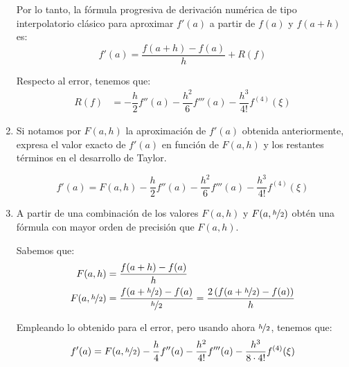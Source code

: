 \begin{ejercicio}
\begin{enumerate}
        Por lo tanto, la fórmula progresiva de derivación numérica de tipo interpolatorio clásico para aproximar $f'(a)$ a partir de $f(a)$ y $f(a + h)$ es:
        \begin{equation*}
            f'(a) = \dfrac{f(a + h) - f(a)}{h} + R(f)
        \end{equation*}

        Respecto al error, tenemos que:
        \begin{align*}
            R(f) &= -\dfrac{h}{2}f''(a) -\dfrac{h^2}{6}f'''(a) -\dfrac{h^3}{4!}f^{(4)}(\xi) 
        \end{align*}

        
        \item Si notamos por $F(a, h)$ la aproximación de $f'(a)$ obtenida anteriormente, expresa el valor exacto de $f'(a)$ en función de $F(a, h)$ y los restantes términos en el desarrollo de Taylor.
        
        \begin{equation*}
            f'(a) = F(a, h) - \dfrac{h}{2}f''(a) -\dfrac{h^2}{6}f'''(a) -\dfrac{h^3}{4!}f^{(4)}(\xi)
        \end{equation*}
        
        \item A partir de una combinación de los valores $F(a, h)$ y $F(a, \nicefrac{h}{2})$ obtén una fórmula con mayor orden de precisión que $F(a, h)$.
        
        Sabemos que:
        \begin{align*}
            F(a,h) &= \dfrac{f(a + h) - f(a)}{h}\\
            F(a,\nicefrac{h}{2}) &= \dfrac{f(a + \nicefrac{h}{2}) - f(a)}{\nicefrac{h}{2}} = \dfrac{2\left(f(a + \nicefrac{h}{2}) - f(a)\right)}{h}
        \end{align*}

        Empleando lo obtenido para el error, pero usando ahora $\nicefrac{h}{2}$, tenemos que:
        \begin{align*}
            f'(a) = F(a,\nicefrac{h}{2}) -\dfrac{h}{4}f''(a) -\dfrac{h^2}{4!}f'''(a) -\dfrac{h^3}{8\cdot 4!}f^{(4)}(\xi) 
        \end{align*}


\end{enumerate}
\end{ejercicio}
